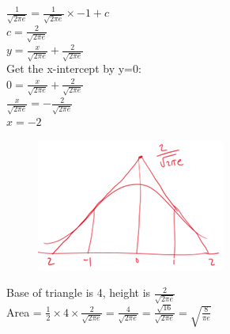 \documentclass[../main.tex]{subfiles}
\begin{document}
\begin{enumerate}
    \(\frac{1}{\sqrt{2\pi e}}=\frac{1}{\sqrt{2\pi e}}\times -1+c\)\\
    \(c=\frac{2}{\sqrt{2\pi e}}\)\\
    \(y=\frac{x}{\sqrt{2\pi e}}+\frac{2}{\sqrt{2\pi e}}\)\\
    Get the x-intercept by y=0:\\
    \(0=\frac{x}{\sqrt{2\pi e}}+\frac{2}{\sqrt{2\pi e}}\)\\
    \(\frac{x}{\sqrt{2\pi e}}=-\frac{2}{\sqrt{2\pi e}}\)\\
    \(x=-2\)
    \begin{figure}[H]
        \centering
        \includegraphics[width=0.25\linewidth]{images/t1w9q3_a2.png}
    \end{figure}
    Base of triangle is 4, height is \(\frac{2}{\sqrt{2\pi e}}\)\\
    Area = \(\frac{1}{2}\times 4 \times \frac{2}{\sqrt{2\pi e}}= \frac{4}{\sqrt{2\pi e}}=\frac{\sqrt{16}}{\sqrt{2\pi e}}=\sqrt{\frac{8}{\pi e}}\)
    
\end{enumerate}
\end{document}

